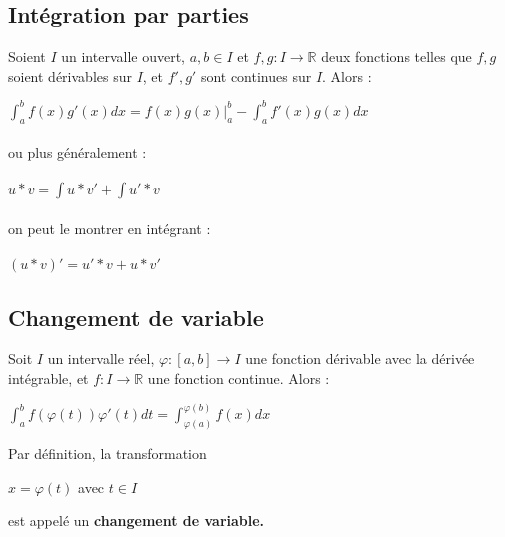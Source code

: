 \documentclass[12pt, a4paper]{book}
\begin{document}
\subsection{Intégration par parties}
Soient $I$ un intervalle ouvert, $a,b \in I$ et $f,g:I \rightarrow \mathbb{R}$ deux fonctions telles que
$f,g$ soient dérivables sur $I$, et $f',g'$ sont continues sur $I$. Alors :\\
\begin{center}
    $\int_{a}^{b} f(x)g'(x) dx = f(x)g(x)|^b _a- \int_{a}^{b} f'(x)g(x) dx$\\
    \ \\
    ou plus généralement :\\
    \ \\
    $u*v = \int u*v' + \int u'* v$\\
    \ \\
    on peut le montrer en intégrant :\\
    \ \\
    $(u*v)'= u'*v + u*v'$
\end{center}
\subsection{Changement de variable}
Soit $I$ un intervalle réel, $\varphi : [a,b] \rightarrow I$ une fonction dérivable avec la dérivée intégrable, et $f: I \rightarrow \mathbb{R}$ une fonction continue. Alors :
\ \\
\begin{center}
    $\int_{a}^{b} f(\varphi(t))\varphi'(t)dt = \int_{\varphi(a)}^{\varphi(b)} f(x) dx$\\
\end{center}
Par définition, la transformation
\begin{center}
    $x = \varphi(t) $ avec $ t\in I$
\end{center}
est appelé un \textbf{changement de variable.}
\end{document}
